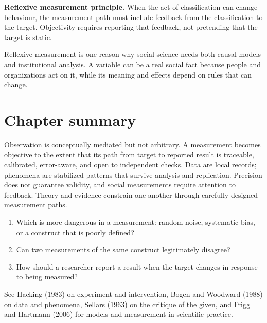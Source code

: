 \begin{principlebox}
\textbf{Reflexive measurement principle.} When the act of classification can
change behaviour, the measurement path must include feedback from the
classification to the target. Objectivity requires reporting that feedback,
not pretending that the target is static.
\end{principlebox}

Reflexive measurement is one reason why social science needs both causal
models and institutional analysis. A variable can be a real social fact
because people and organizations act on it, while its meaning and effects
depend on rules that can change.

\section*{Chapter summary}

Observation is conceptually mediated but not arbitrary. A measurement becomes
objective to the extent that its path from target to reported result is
traceable, calibrated, error-aware, and open to independent checks. Data are
local records; phenomena are stabilized patterns that survive analysis and
replication. Precision does not guarantee validity, and social measurements
require attention to feedback. Theory and evidence constrain one another
through carefully designed measurement paths.

\begin{discussion}
\begin{enumerate}
\item Which is more dangerous in a measurement: random noise, systematic bias,
or a construct that is poorly defined?
\item Can two measurements of the same construct legitimately disagree?
\item How should a researcher report a result when the target changes in
response to being measured?
\end{enumerate}
\end{discussion}

\begin{furtherreading}
See Hacking (1983) on experiment and intervention, Bogen and Woodward (1988)
on data and phenomena, Sellars (1963) on the critique of the given, and
Frigg and Hartmann (2006) for models and measurement in scientific practice.
\end{furtherreading}

